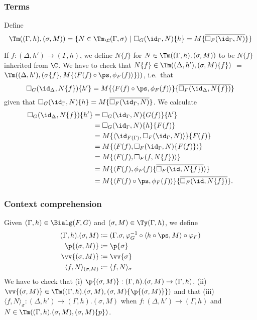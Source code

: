 \documentclass{article}
\newcommand{\isoFL}{\ensuremath{\phi_{F}}} %
\begin{document}
\subsubsection{Terms}

Define
\[
\Tm((\Gamma, h), (\sigma, M)) = \{ N \in \Tm_{\C}(\Gamma, \sigma) \ |\
   \square_G(\id_\Gamma, N)\{h\} = M\{\overline{\square_F(\id_{\Gamma}, N)}\}\}
\]

If $f : (\Delta, h') \to (\Gamma, h)$, we define $N\{f\}$ for $N \in
\Tm((\Gamma, h), (\sigma, M))$ to be $N\{f\}$ inherited from $\C$. We
have to check that $N\{f\} \in \Tm((\Delta, h'), (\sigma, M)\{f\})$
$=$ $\Tm((\Delta, h'), (\sigma\{f\}, M\{\langle F(f) \circ \ps,
\isoFL(f)\rangle\}))$, i.e.\ that
\[
\square_G(\id_\Delta, N\{f\})\{h'\} = M\{\langle F(f) \circ \ps,
\isoFL(f)\rangle\}\{\overline{\square_F(\id_{\Delta}, N\{f\})}\}
\]
given that $\square_G(\id_\Gamma, N)\{h\} =
M\{\overline{\square_F(\id_{\Gamma}, N)}\}$. 
We calculate
\begin{align*}
  \square_G(\id_\Delta, N\{f\})\{h'\}
&= \square_G(\id_\Gamma, N)\{G(f)\}\{h'\} \\
&= \square_G(\id_\Gamma, N)\{h\}\{F(f)\} \\
&= M\{\langle\id_{F(\Gamma)}, \square_F(\id_{\Gamma}, N)\rangle\}\{F(f)\} \\
&= M\{\langle F(f), \square_F(\id_{\Gamma}, N)\{F(f)\}\rangle\} \\
&= M\{\langle F(f), \square_F(f, N\{f\})\rangle\} \\
&= M\{\langle F(f), \isoFL(f)\{\overline{\square_F(\id, N\{f\})}\rangle\} \\
&= M\{\langle F(f) \circ \ps, \isoFL(f)\rangle\}\{\overline{\square_F(\id, N\{f\})}\} .
\end{align*}

\subsubsection{Context comprehension}

Given $(\Gamma, h) \in \Bialg(F, G)$ and $(\sigma, M) \in \Ty(\Gamma,
h)$, we define
\begin{align*}
(\Gamma, h).(\sigma, M) &\coloneqq
  (\Gamma.\sigma, \varphi_G^{-1} \circ \langle h \circ \ps, M \rangle \circ \varphi_F) \\
\p{(\sigma, M)} &\coloneqq \p{\sigma} \\
\vv{(\sigma, M)} &\coloneqq \vv{\sigma} \\
\langle f , N\rangle_{(\sigma, M)} &\coloneqq \langle f , N\rangle_{\sigma}
\end{align*}
We have to check that (i) $\p{(\sigma, M)} : (\Gamma, h).(\sigma, M)
\to (\Gamma, h)$, (ii) $\vv{(\sigma, M)} \in \Tm((\Gamma, h).(\sigma,
M), (\sigma, M)\{\p{(\sigma, M)}\})$ and that (iii) $\langle f ,
N\rangle_{\sigma} : (\Delta, h') \to (\Gamma, h).(\sigma, M)$ when $f
: (\Delta, h') \to (\Gamma, h)$ and $N \in \Tm((\Gamma, h).(\sigma, M), (\sigma, M)\{p\})$.
\end{document}
